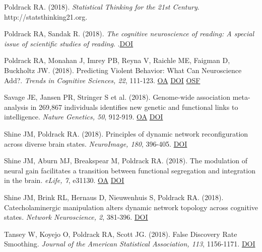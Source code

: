 \documentclass[10pt, letterpaper]{article}
\begin{document}
Poldrack RA.  (2018).  \textit{Statistical Thinking for the 21st Century}. http://statsthinking21.org.\vspace{2mm}

Poldrack RA, Sandak R.  (2018).  \textit{The cognitive neuroscience of reading: A special issue of scientific studies of reading}. .\href{https://doi.org/10.4324/9780203764442}{DOI} \vspace{2mm}

Poldrack RA, Monahan J, Imrey PB, Reyna V, Raichle ME, Faigman D, Buckholtz JW.  (2018). Predicting Violent Behavior: What Can Neuroscience Add?. \textit{Trends in Cognitive Sciences, 22}, 111-123. \href{https://www.ncbi.nlm.nih.gov/pmc/articles/PMC5794654}{OA} \href{https://doi.org/10.1016/j.tics.2017.11.003}{DOI} \href{https://osf.io/tgknp/}{OSF} \vspace{2mm}

Savage JE, Jansen PR, Stringer S et al. (2018). Genome-wide association meta-analysis in 269,867 individuals identifies new genetic and functional links to intelligence. \textit{Nature Genetics, 50}, 912-919. \href{https://www.ncbi.nlm.nih.gov/pmc/articles/PMC6411041}{OA} \href{https://doi.org/10.1038/s41588-018-0152-6}{DOI} \vspace{2mm}

Shine JM, Poldrack RA.  (2018). Principles of dynamic network reconfiguration across diverse brain states. \textit{NeuroImage, 180}, 396-405. \href{https://doi.org/10.1016/j.neuroimage.2017.08.010}{DOI} \vspace{2mm}

Shine JM, Aburn MJ, Breakspear M, Poldrack RA.  (2018). The modulation of neural gain facilitates a transition between functional segregation and integration in the brain. \textit{eLife, 7}, e31130. \href{https://www.ncbi.nlm.nih.gov/pmc/articles/PMC5818252}{OA} \href{https://doi.org/10.7554/elife.31130}{DOI} \vspace{2mm}

Shine JM, Brink RL, Hernaus D, Nieuwenhuis S, Poldrack RA.  (2018). Catecholaminergic manipulation alters dynamic network topology across cognitive states. \textit{Network Neuroscience, 2}, 381-396. \href{https://doi.org/10.1162/netn_a_00042}{DOI} \vspace{2mm}

Tansey W, Koyejo O, Poldrack RA, Scott JG.  (2018). False Discovery Rate Smoothing. \textit{Journal of the American Statistical Association, 113}, 1156-1171. \href{https://doi.org/10.1080/01621459.2017.1319838}{DOI} \vspace{2mm}
\end{document}
